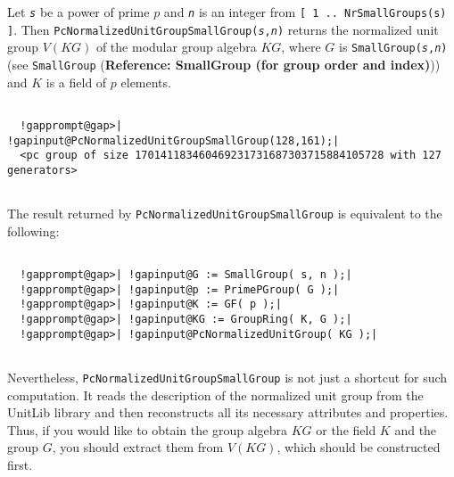 \documentclass[a4paper,11pt]{report}
\begin{document}
{{{ Let \mbox{\texttt{\mdseries\slshape s}} be a power of prime $p$ and \mbox{\texttt{\mdseries\slshape n}} is an integer from \texttt{[ 1 .. NrSmallGroups(s) ]}. Then \texttt{PcNormalizedUnitGroupSmallGroup(\mbox{\texttt{\mdseries\slshape s}},\mbox{\texttt{\mdseries\slshape n}})} returns the normalized unit group $V(KG)$ of the modular group algebra $KG$, where $G$ is \texttt{SmallGroup(\mbox{\texttt{\mdseries\slshape s}},\mbox{\texttt{\mdseries\slshape n}})} (see \texttt{SmallGroup} (\textbf{Reference: SmallGroup (for group order and index)})) and $K$ is a field of $p$ elements. }

 \newpage 
\begin{Verbatim}[commandchars=!@|,fontsize=\small,frame=single,label=Example]
  
  !gapprompt@gap>| !gapinput@PcNormalizedUnitGroupSmallGroup(128,161);|
  <pc group of size 170141183460469231731687303715884105728 with 127 generators>
  
\end{Verbatim}
 The result returned by \texttt{PcNormalizedUnitGroupSmallGroup} is equivalent to the following: 
\begin{Verbatim}[commandchars=!@|,fontsize=\small,frame=single,label=Example]
                                                                           
  !gapprompt@gap>| !gapinput@G := SmallGroup( s, n );|
  !gapprompt@gap>| !gapinput@p := PrimePGroup( G );|
  !gapprompt@gap>| !gapinput@K := GF( p );|
  !gapprompt@gap>| !gapinput@KG := GroupRing( K, G );|
  !gapprompt@gap>| !gapinput@PcNormalizedUnitGroup( KG );|
                                                                                 
\end{Verbatim}
 Nevertheless, \texttt{PcNormalizedUnitGroupSmallGroup} is not just a shortcut for such computation. It reads the description of the
normalized unit group from the \textsf{UnitLib} library and then reconstructs all its necessary attributes and properties.
Thus, if you would like to obtain the group algebra $KG$ or the field $K$ and the group $G$, you should extract them from $V(KG)$, which should be constructed first. 
\begin{Verbatim}[commandchars=!@|,fontsize=\small,frame=single,label=Example]
  

\end{Verbatim}}}
\end{document}
